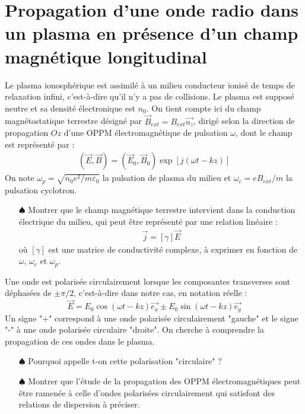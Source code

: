 \documentclass{report}
\begin{document}
\newpage

\section*{Propagation d'une onde radio dans un plasma en présence d'un champ magnétique longitudinal}

Le plasma ionosphérique est assimilé à un milieu conducteur ionisé de temps de relaxation infini, c'est-à-dire qu'il n'y a pas de collisions. Le plasma est supposé neutre et sa densité électronique est $n_0$. On tient compte ici du champ magnétostatique terrestre désigné par $\vec{B}_{ext}=B_{ext}\vec{u_z}$, dirigé selon la direction de propagation $Oz$ d'une OPPM électromagnétique de pulsation $\omega$, dont le champ est représenté par :
\begin{align*}
	(\vec{E},\vec{B})=(\vec{E}_0,\vec{B}_0)\exp[j(\omega t-kz)]
\end{align*}
On note $\omega_p=\sqrt{n_0e^2/m\varepsilon_0}$ la pulsation de plasma du milieu et $\omega_c=eB_{ext}/m$ la pulsation cyclotron. 

\begin{itemize}
	
	\item[$\spadesuit$] Montrer que le champ magnétique terrestre intervient dans la conduction électrique du milieu, qui peut être représenté par une relation linéaire :
	\begin{align*}
		\vec{j}=\left[\gamma \right] \vec{E}
	\end{align*}
	où $\left[\gamma \right]$ est une matrice de conductivité complexe, à exprimer en fonction de $\omega$, $\omega_c$ et $\omega_p$.
	
\end{itemize}

Une onde est polarisée circulairement lorsque les composantes transverses sont déphasées de $\pm\pi/2$, c'est-à-dire dans notre cas, en notation réelle :
\begin{equation}
	\vec{E}=E_0\cos(\omega t - kz)\vec{e_x}\pm E_0\sin(\omega t - kz)\vec{e_y}
\end{equation}
Un signe "+" correspond à une onde polarisée circulairement "gauche" et le signe "-" à une onde polarisée circulaire "droite". On cherche à comprendre la propagation de ces ondes dans le plasma.

\begin{itemize}

	\item[$\spadesuit$] Pourquoi appelle t-on cette polarisation "circulaire" ? 
	
	\item[$\spadesuit$] Montrer que l'étude de la propagation des OPPM électromagnétiques peut être ramenée à celle d'ondes polarisées circulairement qui satisfont des relations de dispersion à préciser. 
	
\end{itemize}
\end{document}
